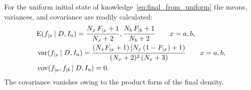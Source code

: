 \documentclass[\ifafour a4paper,12pt,\else a5paper,10pt,\fi%
onecolumn,oneside,article,%
british%
]{memoir}
\theoremstyle{remark}
\theoremstyle{innote}
\newcommand*{\E}{\mathrm{E}}
\renewcommand*{\|}[1][]{\nonscript\,#1\vert\nonscript\;\mathopen{}}
\DeclareMathOperator{\cov}{cov}
\DeclareMathOperator{\var}{var}
\newcommand*{\yD}{D}
\newcommand*{\yI}{I}
\newcommand*{\yIu}{\yI_\text{u}}
\newcommand*{\ya}{a}
\newcommand*{\yb}{b}
\begin{document}
For the uniform initial state of knowledge~\eqref{eq:final_from_uniform}
the means, variances, and covariance are readily calculated:
\begin{subequations}
  \label{eq:stats_final_unif}
  \begin{align}
    \label{eq:mean_final_unif}
    &\E(f_{|x}\| \yD, \yIu) =
    \frac{N_{x}\,F_{|x}+1}{N_{x}+2},
    \frac{N_{\yb}\,F_{|\yb}+1}{N_{\yb}+2}
    \qquad x=\ya,\yb,
    \\
    \label{eq:var_final_unif}
    &\var(f_{|x} \| \yD, \yIu) =
    \frac{(N_{x}F_{|x}+1)\,[N_{x}\,(1-F_{|x})+1)}{(N_{x}+2)^2\,(N_{x}+3)}
    \qquad x=\ya,\yb,
    \\
    \label{eq:cov_final_unif}
    &\cov(f_{|\ya}, f_{|\yb} \| \yD, \yIu) = 0.
  \end{align}
\end{subequations}
The covariance vanishes owing to the product form of the final density.
\end{document}
